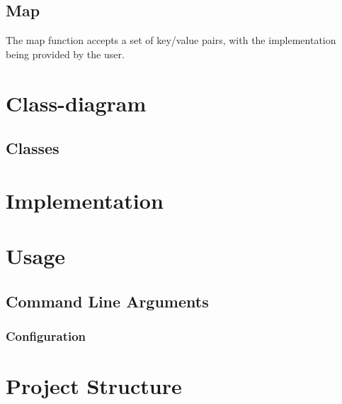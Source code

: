 \documentclass[12pt, letterpaper]{article}
\begin{document}
\subsection{Map}

The map function accepts a set of key/value pairs, with the implementation being provided by the user. 

\section{Class-diagram}


\subsection{Classes}


\section{Implementation}


\section{Usage}
\label{usage}

\subsection{Command Line Arguments}

\subsubsection{Configuration}


\newpage

\section{Project Structure}


\newpage

\printbibliography
\end{document}
